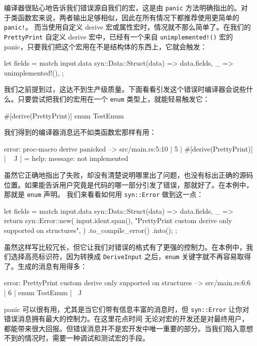 \label{idx:idx_72685fc9}
\label{idx:idx_69a12ade}
编译器很贴心地告诉我们错误源自我们的宏，这是由 \texttt{panic} 方法明确指出的。对于类函数宏来说，两者输出足够相似，因此在所有情况下都推荐使用更简单的 \texttt{panic!}。
而当使用自定义 derive 宏或属性宏时，情况就不那么简单了。在我们的 \texttt{PrettyPrint} 自定义 derive 宏中，已经有一个来自 \texttt{unimplemented!(\allowbreak{})\allowbreak{}} 宏的 panic，只要我们把这个宏用在不是结构体的东西上，它就会触发：
\begin{codebox}[rust]
let fields = match input.data {
    syn::Data::Struct(data) => data.fields,
    _ => unimplemented!(),
};
\end{codebox}
我们之前提到过，这达不到生产级质量。下面看看引发这个错误时编译器会说些什么。只要尝试把我们的宏用在一个 \texttt{enum} 类型上，就能轻易触发它：
\begin{codebox}[rust]
#[derive(PrettyPrint)]
enum TestEnum {}
\end{codebox}
我们得到的编译器消息远不如类函数宏那样有用：
\begin{codebox}[rust]
error: proc-macro derive panicked
 --> src/main.rs:5:10
  |
5 | #[derive(PrettyPrint)]
  |          ^^^^^^^^^^^
  |
  = help: message: not implemented
\end{codebox}
\label{idx:idx_84b69219}
\label{idx:idx_af4317ea}
虽然它正确地指出了失败，却没有清楚说明哪里出了问题，也没有标出正确的源码位置。如果能告诉用户究竟是代码的哪一部分引发了错误，那就好了。在本例中，那就是 \texttt{enum} 声明。
我们来看看如何用 \texttt{syn::Error} 做到这一点：
\begin{codebox}[rust]
let fields = match input.data {
    syn::Data::Struct(data) => data.fields,
    _ => {
        return syn::Error::new(
            input.ident.span(),
            "PrettyPrint custom derive only supported on structures",
        )
        .to_compile_error()
        .into();
    }
};
\end{codebox}
虽然这样写比较冗长，但它让我们对错误的格式有了更强的控制力。在本例中，我们选择高亮标识符，因为转换成 \texttt{DeriveInput} 之后，\texttt{enum} 关键字就不再容易取得了。生成的消息有用得多：
\begin{codebox}[rust]
error: PrettyPrint custom derive only supported on structures
 --> src/main.rs:6:6
  |
6 | enum TestEnum {}
  |      ^^^^^^^^
\end{codebox}
\label{idx:idx_ed7af2e4}
\label{idx:idx_2198a3a0}
panic 可以很有用，尤其是当它们带有信息丰富的消息时，但
\texttt{syn::Error} 让你对错误消息拥有最大的控制力。在这里花点时间
无论对宏的开发还是对最终用户，都能带来很大回报。但错误消息并不是宏开发中唯一重要的部分。当我们陷入意想不到的情况时，需要一种调试和测试宏的手段。
